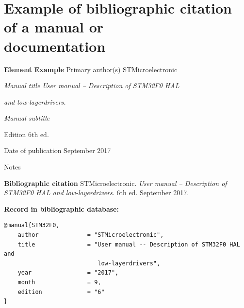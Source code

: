 
\newpage
\section*{Example of bibliographic citation of a manual or \\ documentation}
\label{pr-manual-doc}
\begin{tabbing}
\zarazky
\textbf{Element} \> \textbf{Example} \odradkovani
Primary author(s) \>
STMicroelectronic

\odradkovani
{\em Manual title} \>
{\em User manual -- Description of STM32F0 HAL}
    
    \odradkovani \>
    {\em and low-layerdrivers.}

\odradkovani
{\em Manual subtitle}\footnotemark[1] \>

\odradkovani
Edition \>
6th ed.

\odradkovani
Date of publication \>
September 2017

\odradkovani
Notes\footnotemark[2] \>

\odradkovani
\end{tabbing}

\noindent \textbf{Bibliographic citation} \odradkovani
{\sc STMicroelectronic}. {\em User manual -- Description of STM32F0 HAL and low-layerdrivers}. 6th ed. September 2017.

\bigskip \bigskip
\noindent \textbf{Record in bibliographic database:}
\vspace{-0.5em}
\begin{verbatim}
@manual{STM32F0,
    author              = "STMicroelectronic",
    title               = "User manual -- Description of STM32F0 HAL and 
                           low-layerdrivers",
    year                = "2017",
    month               = 9,
    edition             = "6"
}
\end{verbatim}


\newpage
